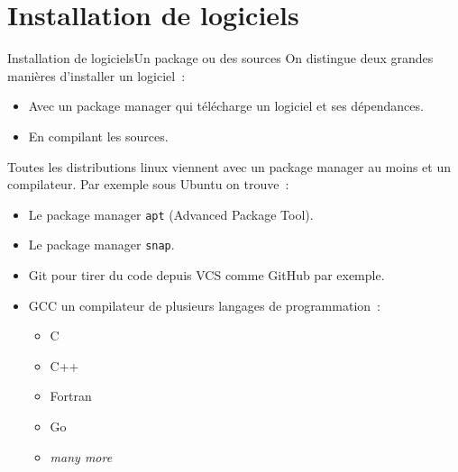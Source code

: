 \documentclass{beamer}
\begin{document}
    \section{Installation de logiciels}\label{sec:installation}

    \begin{frame}{Installation de logiciels}{Un package ou des sources}
        On distingue deux grandes manières d'installer un logiciel~:
        \begin{itemize}
            \item Avec un package manager qui télécharge un logiciel et ses dépendances.
            \item En compilant les sources.
        \end{itemize}
        \bigbreak
        Toutes les distributions linux viennent avec un package manager au moins et un compilateur.
        Par exemple sous Ubuntu on trouve~:
        \begin{itemize}
            \item Le package manager \lstinline{apt} (Advanced Package Tool).
            \item Le package manager \lstinline{snap}.
            \item Git pour tirer du code depuis VCS comme GitHub par exemple.
            \item GCC un compilateur de plusieurs langages de programmation~:
            \begin{itemize}
                \item C
                \item C++
                \item Fortran
                \item Go
                \item \textit{many more}
            \end{itemize}
        \end{itemize}
    \end{frame}
\end{document}
